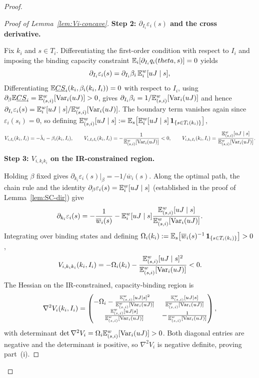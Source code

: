 \documentclass[master.tex]{subfiles}
\begin{document}
\begin{proof}
\begin{proof}[Proof of Lemma~\ref{lem:Vi-concave}]
\noindent\textbf{Step 2: \(\partial_{I_i}\varepsilon_i(s)\) and the cross derivative.}

Fix $k_i$ and $s\in T_i$. Differentiating the first-order condition with respect to $I_i$ and imposing the binding capacity constraint $\mathbb{E}_i[\partial_{I_i}q_i(theta,s)]=0$ yields
\[
\partial_{I_i}\varepsilon_i(s) = \partial_{I_i}\beta_i\,\mathsf {\mathbb{E}}_i^w[uJ\mid s],
\]
Differentiating $\mathbb{E} \underline{CS}_i(k_i,\beta_i(k_i,I_i))=0$ with respect to $I_i$, using $\partial_\beta\mathbb{E} \underline{CS}_i=\mathbb{E}_{(s,i)}^w[\mathrm{Var}_i(uJ)]>0$, gives $\partial_{I_i}\beta_i=1/\mathbb{E}_{(s,i)}^w[\mathrm{Var}_i(uJ)]$ and hence $\partial_{I_i}\varepsilon_i(s)=\mathsf {\mathbb{E}}_i^w[uJ\mid s]/\mathbb{E}_{(s,i)}^w[\mathrm{Var}_i(uJ)]$. The boundary term vanishes again since $\varepsilon_i(s_i)=0$, so defining $\mathbb{E}_{(s,i)}^w[uJ\mid s]:=\mathbb{E}_s\!\left[\mathsf {\mathbb{E}}_i^w[uJ\mid s]\,\mathbf{1}_{\{s\in T_i(k_i)\}}\right]$,
\[
V_{i,I_i}(k_i,I_i)= -\tilde\lambda_i-\beta_i(k_i,I_i), \qquad V_{i,I_iI_i}(k_i,I_i)= -\frac{1}{\mathbb{E}_{(s,i)}^w[\mathrm{Var}_i(uJ)]}<0, \qquad V_{i,k_iI_i}(k_i,I_i) = \frac{\mathbb{E}_{(s,i)}^w[uJ\mid s]}{\mathbb{E}_{(s,i)}^w[\mathrm{Var}_i(uJ)]}.
\]


\noindent\textbf{Step 3: \(V_{i,k_ik_i}\) on the IR-constrained region.}

Holding $\beta$ fixed gives $\partial_{k_i}\varepsilon_i(s)|_\beta = -1/\overline w_i(s)$. Along the optimal path, the chain rule and the identity $\partial_\beta\varepsilon_i(s)=\mathsf {\mathbb{E}}_i^w[uJ\mid s]$ (established in the proof of Lemma~\ref{lem:SC-dir}) give
\[
\partial_{k_i}\varepsilon_i(s) = -\frac{1}{\overline w_i(s)} - \mathsf {\mathbb{E}}_i^w[uJ\mid s]\frac{\mathbb{E}_{(s,i)}^w[uJ\mid s]}{\mathbb{E}_{(s,i)}^w[\mathrm{Var}_i(uJ)]}.
\]
Integrating over binding states and defining $\Omega_i(k_i):=\mathbb{E}_s\!\left[\overline w_i(s)^{-1}\,\mathbf{1}_{\{s\in T_i(k_i)\}}\right]>0$,
\[
V_{i,k_ik_i}(k_i,I_i) = -\Omega_i(k_i)-\frac{\mathbb{E}_{(s,i)}^w[uJ\mid s]^2}{\mathbb{E}_{(s,i)}^w[\mathrm{Var}_i(uJ)]}<0.
\]
The Hessian on the IR-constrained, capacity-binding region is
\[
\nabla^2 V_i(k_i,I_i) = \begin{pmatrix} -\Omega_i-\frac{\mathbb{E}_{(s,i)}^w[uJ\mid s]^2}{\mathbb{E}_{(s,i)}^w[\mathrm{Var}_i(uJ)]} & \frac{\mathbb{E}_{(s,i)}^w[uJ\mid s]}{\mathbb{E}_{(s,i)}^w[\mathrm{Var}_i(uJ)]} \\[0.4em] \frac{\mathbb{E}_{(s,i)}^w[uJ\mid s]}{\mathbb{E}_{(s,i)}^w[\mathrm{Var}_i(uJ)]} & -\frac{1}{\mathbb{E}_{(s,i)}^w[\mathrm{Var}_i(uJ)]} \end{pmatrix},
\]
with determinant $\det\nabla^2 V_i = \Omega_i\mathbb{E}_{(s,i)}^w[\mathrm{Var}_i(uJ)] > 0$. Both diagonal entries are negative and the determinant is positive, so $\nabla^2 V_i$ is negative definite, proving part~(i).



\end{proof}
\end{proof}
\end{document}
